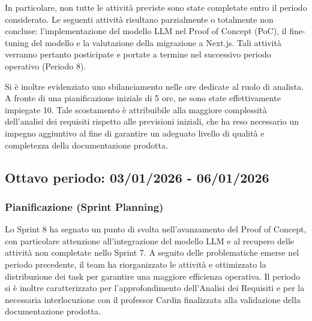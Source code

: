 \documentclass[a4paper, 11pt, oneside]{scrartcl} %
\begin{document}
In particolare, non tutte le attività previste sono state completate entro il periodo considerato. Le seguenti attività risultano parzialmente o totalmente non concluse: 
l’implementazione del modello LLM nel Proof of Concept (PoC), il fine-tuning del modello e la valutazione della migrazione a Next.js. Tali attività verranno pertanto posticipate e portate a termine nel successivo periodo operativo (Periodo 8).

Si è inoltre evidenziato uno sbilanciamento nelle ore dedicate al ruolo di analista. A fronte di una pianificazione iniziale di 5 ore, ne sono state effettivamente impiegate 10. 
Tale scostamento è attribuibile alla maggiore complessità dell’analisi dei requisiti rispetto alle previsioni iniziali, che ha reso necessario un impegno aggiuntivo al fine di garantire un adeguato livello di qualità e completezza della documentazione prodotta.
\newpage



\subsection{Ottavo periodo: 03/01/2026 - 06/01/2026}

\subsubsection*{Pianificazione (Sprint Planning)}

Lo Sprint 8 ha segnato un punto di svolta nell'avanzamento del Proof of Concept, con particolare attenzione all'integrazione del modello LLM e al recupero delle attività non completate nello Sprint 7. A seguito delle problematiche emerse nel periodo precedente, il team ha riorganizzato le attività e ottimizzato la distribuzione dei task per garantire una maggiore efficienza operativa. Il periodo si è inoltre caratterizzato per l'approfondimento dell'Analisi dei Requisiti e per la necessaria interlocuzione con il professor Cardin finalizzata alla validazione della documentazione prodotta.
\end{document}
